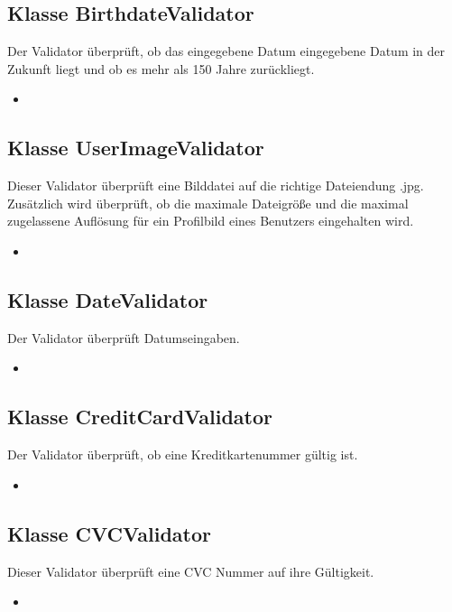 	\subsection{Klasse BirthdateValidator}
	Der Validator überprüft, ob das eingegebene Datum eingegebene Datum in der Zukunft liegt und ob es mehr als 150 Jahre zurückliegt.
	\begin{itemize}
		\item \override
	\end{itemize}
	
	\subsection{Klasse UserImageValidator}
	Dieser Validator überprüft eine Bilddatei auf die richtige Dateiendung .jpg. Zusätzlich wird überprüft, ob
	die maximale Dateigröße und die maximal zugelassene Auflösung für ein Profilbild eines Benutzers eingehalten wird.
	\begin{itemize}
		\item \override
	\end{itemize}
	
	\subsection{Klasse DateValidator}
	Der Validator überprüft Datumseingaben.
	\begin{itemize}
		\item \override
	\end{itemize}
	
	\subsection{Klasse CreditCardValidator}
	Der Validator überprüft, ob eine Kreditkartenummer gültig ist.
	\begin{itemize}
		\item \override
	\end{itemize}
	
	\subsection{Klasse CVCValidator}
	Dieser Validator überprüft eine CVC Nummer auf ihre Gültigkeit.
	\begin{itemize}
		\item \override
	\end{itemize}
	
